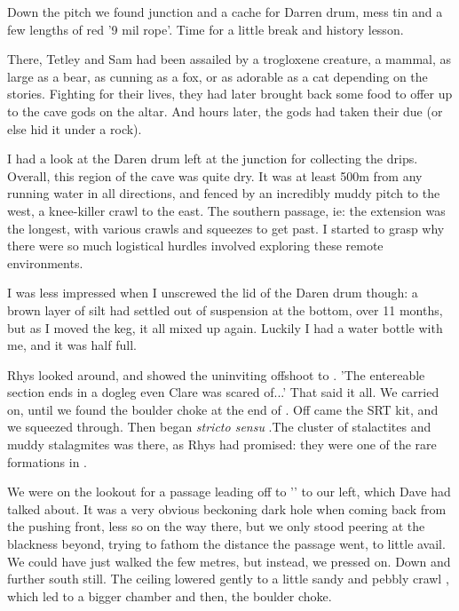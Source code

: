 Down the pitch we found  junction and a cache for Darren drum, mess tin and a few lengths of red '9 mil rope'. Time for a little break and history lesson. 

There, Tetley and Sam had been assailed by a trogloxene creature, a mammal, as large as a bear, as cunning as a fox, or as adorable as a cat depending on the stories. Fighting for their lives, they had later brought back some food to offer up to the cave gods on the  altar. And hours later, the gods had taken their due (or else hid it under a rock). 

I had a look at the Daren drum left at the junction for collecting the drips. Overall, this region of the cave was quite dry. It was at least 500m from any running water in all directions, and fenced by an incredibly muddy pitch to the west, a knee-killer crawl to the east. The southern passage, ie: the  extension was the longest, with various crawls and squeezes to get past. I started to grasp why there were so much logistical hurdles involved exploring these remote environments.

I was less impressed when I unscrewed the lid of the Daren drum though: a brown layer of silt had settled out of suspension at the bottom, over 11 months, but as I moved the keg, it all mixed up again. Luckily I had a water bottle with me, and it was half full.

Rhys looked around, and showed the uninviting offshoot to . 'The entereable section ends in a dogleg even Clare was scared of...' That said it all. We carried on, until we found the boulder choke at the end of . Off came the SRT kit, and we squeezed through. 
Then began  \emph{stricto sensu} .The cluster of stalactites and muddy stalagmites was there, as Rhys had promised: they were one of the rare formations in . 

We were on the lookout for a passage leading off to '' to our left, which Dave had talked about. It was a very obvious beckoning dark hole when coming back from the pushing front, less so on the way there, but we only stood peering at the blackness beyond, trying to fathom the distance the passage went, to little avail. We could have just walked the few metres, but instead, we pressed on. Down and further south still. The ceiling lowered gently to a little sandy and pebbly crawl , which led to a bigger chamber and then, the boulder choke.

